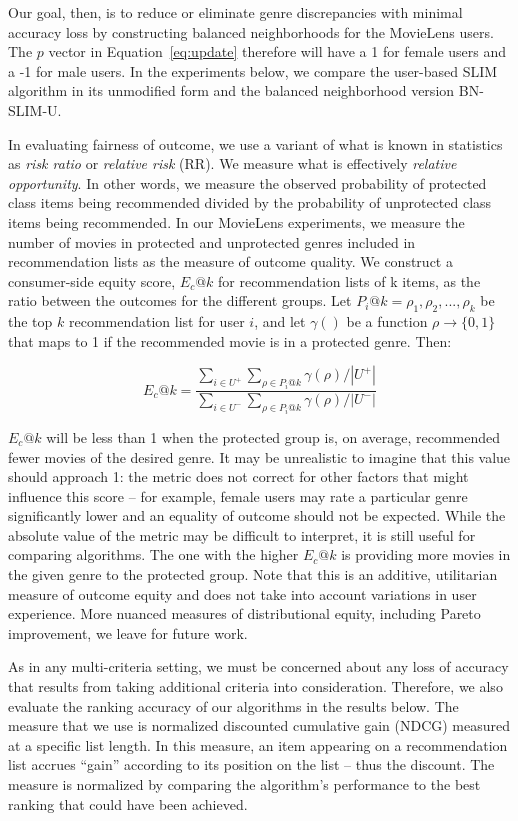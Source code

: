 Our goal, then, is to reduce or eliminate genre discrepancies with minimal accuracy loss by constructing balanced neighborhoods for the MovieLens users. The $p$ vector in Equation~\ref{eq:update} therefore will have a 1 for female users and a -1 for male users. In the experiments below, we compare the user-based SLIM algorithm in its unmodified form and the balanced neighborhood version BN-SLIM-U.

In evaluating fairness of outcome, we use a variant of what is known in statistics as \textit{risk ratio} or \textit{relative risk} (RR)\cite{romei2014multidisciplinary}. We measure what is effectively \textit{relative opportunity}. In other words, we measure the observed probability of protected class items being recommended divided by the probability of unprotected class items being recommended. In our MovieLens experiments, we measure the number of movies in protected and unprotected genres included in recommendation lists  as the measure of outcome quality. We construct a consumer-side equity score, $E_c@k$ for recommendation lists of k items, as the ratio between the outcomes for the different groups. Let $P_i@k = {\rho_1, \rho_2, ..., \rho_k}$ be the top $k$ recommendation list for user $i$, and let $\gamma()$ be a function $\rho \rightarrow \{0,1\}$ that maps to 1 if the recommended movie is in a protected genre. Then:

\begin{equation}
E_c@k=\frac{\sum_{i \in U^+}{\sum_{\rho \in P_i@k}{\gamma(\rho)}}/|U^+|}
{\sum_{i \in U^-}{\sum_{\rho \in P_i@k}{\gamma(\rho)}}/|U^-|}
\end{equation}

$E_c@k$ will be less than 1 when the protected group is, on average, recommended fewer movies of the desired genre. It may be unrealistic to imagine that this value should approach 1: the metric does not correct for other factors that might influence this score -- for example, female users may rate a particular genre significantly lower and an equality of outcome should not be expected. While the absolute value of the metric may be difficult to interpret, it is still useful for comparing algorithms. The one with the higher $E_c@k$ is providing more movies in the given genre to the protected group. Note that this is an additive, utilitarian measure of outcome equity and does not take into account variations in user experience. More nuanced measures of distributional equity, including Pareto improvement, we leave for future work.

As in any multi-criteria setting, we must be concerned about any loss of accuracy that results from taking additional criteria into consideration. Therefore, we also evaluate the ranking accuracy of our algorithms in the results below. The measure that we use is normalized discounted cumulative gain (NDCG) measured at a specific list length. In this measure, an item appearing on a recommendation list accrues ``gain'' according to its position on the list -- thus the discount. The measure is normalized by comparing the algorithm's performance to the best ranking that could have been achieved. 

